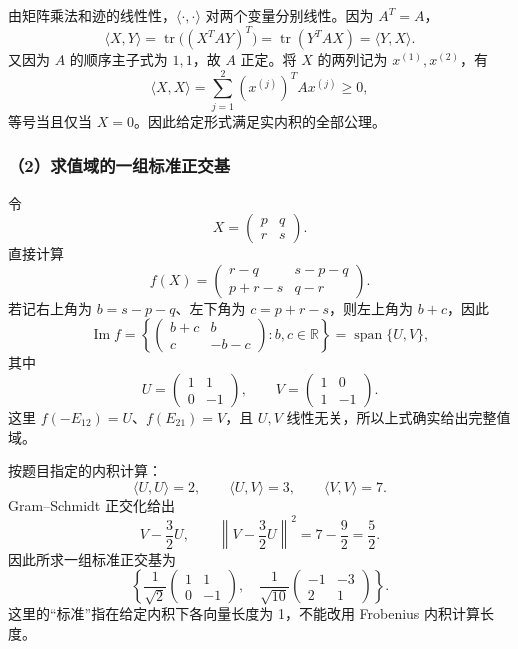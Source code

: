 \documentclass[11pt,fontset=fandol]{ctexart}
\begin{document}
由矩阵乘法和迹的线性性，\(\langle\cdot,\cdot\rangle\)
对两个变量分别线性。因为 \(A^T=A\)， \[
\langle X,Y\rangle
=\operatorname{tr}\bigl((X^TAY)^T\bigr)
=\operatorname{tr}(Y^TAX)=\langle Y,X\rangle.
\] 又因为 \(A\) 的顺序主子式为 \(1,1\)，故 \(A\) 正定。将 \(X\)
的两列记为 \(x^{(1)},x^{(2)}\)，有 \[
\langle X,X\rangle
=\sum_{j=1}^2(x^{(j)})^TAx^{(j)}\geq0,
\] 等号当且仅当 \(X=0\)。因此给定形式满足实内积的全部公理。

\subsubsection{（2）求值域的一组标准正交基}\label{ux6c42ux503cux57dfux7684ux4e00ux7ec4ux6807ux51c6ux6b63ux4ea4ux57fa}

令 \[
X=\begin{pmatrix}p&q\\r&s\end{pmatrix}.
\] 直接计算 \[
f(X)=\begin{pmatrix}
r-q&s-p-q\\
p+r-s&q-r
\end{pmatrix}.
\] 若记右上角为 \(b=s-p-q\)、左下角为 \(c=p+r-s\)，则左上角为
\(b+c\)，因此 \[
\operatorname{Im}f
=\left\{\begin{pmatrix}b+c&b\\c&-b-c\end{pmatrix}:b,c\in\mathbb R\right\}
=\operatorname{span}\{U,V\},
\] 其中 \[
U=\begin{pmatrix}1&1\\0&-1\end{pmatrix},\qquad
V=\begin{pmatrix}1&0\\1&-1\end{pmatrix}.
\] 这里 \(f(-E_{12})=U\)、\(f(E_{21})=V\)，且 \(U,V\)
线性无关，所以上式确实给出完整值域。

按题目指定的内积计算： \[
\langle U,U\rangle=2,\qquad
\langle U,V\rangle=3,\qquad
\langle V,V\rangle=7.
\] Gram--Schmidt 正交化给出 \[
V-\frac32U,\qquad
\left\|V-\frac32U\right\|^2=7-\frac92=\frac52.
\] 因此所求一组标准正交基为 \[
\boxed{\left\{
\frac1{\sqrt2}\begin{pmatrix}1&1\\0&-1\end{pmatrix},\quad
\frac1{\sqrt{10}}\begin{pmatrix}-1&-3\\2&1\end{pmatrix}
\right\}.}
\] 这里的``标准''指在给定内积下各向量长度为 1，不能改用 Frobenius
内积计算长度。
\end{document}
